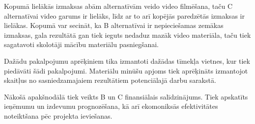 \par
Kopumā lielākās izmaksas abām alternatīvām veido video filmēšana, taču C alternatīvai video garums
ir lielāks, līdz ar to arī kopējās paredzētās izmaksas ir lielākas. Kopumā var secināt, ka B alternatīvai
ir nepieciešamas zemākas izmaksas, gala rezultātā gan tiek ieguts nedaduz mazāk video materiāla, taču tiek
sagatavoti skolotāji mācību materiālu pasniegšanai.
\par
Dažādu pakalpojumu aprēķiniem tika izmantoti dažādas tīmekļa vietnes, kur tiek piedāvāti šādi pakalpojumi.
Materiālu minūšu apjoms tiek aprēķināts izmantojot skaitļus no sasniedzamajaiem rezultātiem potenciālajā
darbu sarakstā.
\par
Nākošā apakšnodālā tiek veikts B un C finansiālais salīdzinājums. Tiek apskatīts 
ieņēmumu un izdevumu prognozēšana, kā arī ekomoniksās efektivitātes noteiktšana pēc 
projekta ieviešanas.

  